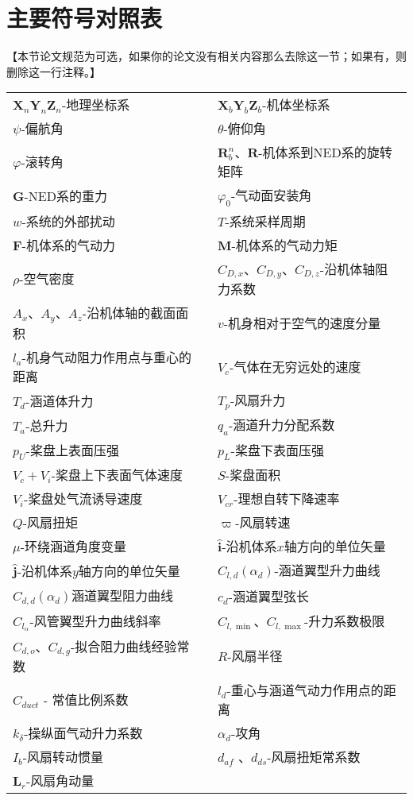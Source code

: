 \chapter{主要符号对照表}
【本节论文规范为可选，如果你的论文没有相关内容那么去除这一节；如果有，则删除这一行注释。】
\begin{table}
	\centering{}%
	\begin{tabular}{l>{\centering}p{0.5cm}l}
	 $ \boldsymbol{X}_n\boldsymbol{Y}_n\boldsymbol{Z}_n $-地理坐标系           &  & ${\boldsymbol{X}_b}{\boldsymbol{Y}_b}{\boldsymbol{Z}_b}$-机体坐标系\tabularnewline
	 $ \psi $-偏航角								   &  & $\theta$-俯仰角\tabularnewline
	 $\varphi$-滚转角  							   &  & $\boldsymbol{R}^n_b$、$\boldsymbol{R}$-机体系到NED系的旋转矩阵\tabularnewline
	 $\boldsymbol{G}$-NED系的重力  							  &  &   $\varphi_0 $-气动面安装角\tabularnewline
	 $ w $-系统的外部扰动								&  &  $T$-系统采样周期\tabularnewline
	 $\boldsymbol{F}$-机体系的气动力 						    &  &   $\boldsymbol{M}$-机体系的气动力矩\tabularnewline
	 $\rho$-空气密度 								  &  &  $C_{D,x} $、$ C_{D,y} $、$ C_{D,z} $-沿机体轴阻力系数\tabularnewline
	 $A_x $、$ A_y $、$ A_z $-沿机体轴的截面面积 		 &  &  $v$-机身相对于空气的速度分量\tabularnewline 
	 $l_{a}$-机身气动阻力作用点与重心的距离   			  &  &  $V_c$-气体在无穷远处的速度\tabularnewline
	 $T_d$-涵道体升力  								 &  &  $T_p$-风扇升力\tabularnewline
	 $T_a$-总升力 								      &  &  $q_a$-涵道升力分配系数\tabularnewline
	 $ p_U $-桨盘上表面压强 						   &  &  $p_L$-桨盘下表面压强\tabularnewline
	 $V_c+V_i$-桨盘上下表面气体速度 					 &  &  $S$-桨盘面积\tabularnewline
	 $ V_i $-桨盘处气流诱导速度 						  &  &  $ V_{cr} $-理想自转下降速率\tabularnewline
	 $ Q $-风扇扭矩 								 &  &  $ \varpi $-风扇转速\tabularnewline
	 $\mu$-环绕涵道角度变量 						  &  &  $\hat{\boldsymbol{i}}$-沿机体系$x$轴方向的单位矢量\tabularnewline 
	 $\hat{\boldsymbol{j}}$-沿机体系$y$轴方向的单位矢量  	   &  &  $C_{l, d}(\alpha_d)$-涵道翼型升力曲线\tabularnewline 
	 $C_{d, d}(\alpha_d)$涵道翼型阻力曲线  		      &  &  $c_d$-涵道翼型弦长\tabularnewline 
	 $C_{l_{\alpha}}$-风管翼型升力曲线斜率  			 &  &  $C_{l, \min }$、$ C_{l, \max } $-升力系数极限\tabularnewline 
	 $C_{d, o }$、$C_{d, g }$-拟合阻力曲线经验常数 	&  &  $R$-风扇半径\tabularnewline 
	 $C_{d u c t}$ - 常值比例系数  					&  &  $l_{d}$-重心与涵道气动力作用点的距离\tabularnewline
	 $k_{\delta}$-操纵面气动升力系数 				 &  &  $\alpha_d$-攻角\tabularnewline
	 $ I_{b}$-风扇转动惯量  						   &  &  $ d_{af} $ 、$ d_{ds} $-风扇扭矩常系数\tabularnewline
	 $\boldsymbol{L}_{{r}}$-风扇角动量  						&  & \tabularnewline 					
	\end{tabular}
\end{table}
